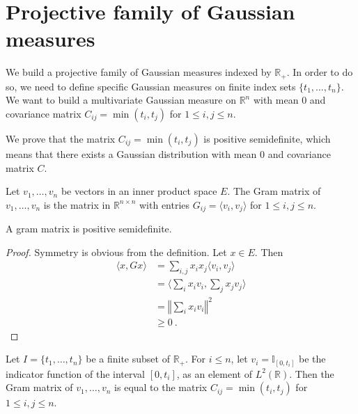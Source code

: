 \section{Projective family of Gaussian measures}

We build a projective family of Gaussian measures indexed by $\mathbb{R}_+$.
In order to do so, we need to define specific Gaussian measures on finite index sets $\{t_1, \ldots, t_n\}$.
We want to build a multivariate Gaussian measure on $\mathbb{R}^n$ with mean $0$ and covariance matrix $C_{ij} = \min(t_i, t_j)$ for $1 \leq i,j \leq n$.

We prove that the matrix $C_{ij} = \min(t_i, t_j)$ is positive semidefinite, which means that there exists a Gaussian distribution with mean 0 and covariance matrix $C$.

\begin{definition}\label{def:gramMatrix}
  \mathlibok
Let $v_1, \ldots, v_n$ be vectors in an inner product space $E$.
The Gram matrix of $v_1, \ldots, v_n$ is the matrix in $\mathbb{R}^{n \times n}$ with entries $G_{ij} = \langle v_i, v_j \rangle$ for $1 \leq i,j \leq n$.
\end{definition}


\begin{lemma}\label{lem:posSemidef_gramMatrix}
  \mathlibok
A gram matrix is positive semidefinite.
\end{lemma}

\begin{proof}Symmetry is obvious from the definition.
Let $x \in E$. Then
\begin{align*}
  \langle x, G x \rangle
  &= \sum_{i,j} x_i x_j \langle v_i, v_j \rangle
  \\
  &= \langle \sum_i x_i v_i, \sum_j x_j v_j \rangle
  \\
  &= \left\Vert \sum_i x_i v_i \right\Vert^2
  \\
  &\ge 0
  \: .
\end{align*}
\end{proof}


\begin{lemma}\label{lem:C_eq_gramMatrix}
  \leanok
Let $I = \{t_1, \ldots, t_n\}$ be a finite subset of $\mathbb{R}_+$.
For $i \le n$, let $v_i = \mathbb{I}_{[0, t_i]}$ be the indicator function of the interval $[0, t_i]$, as an element of $L^2(\mathbb{R})$.
Then the Gram matrix of $v_1, \ldots, v_n$ is equal to the matrix $C_{ij} = \min(t_i, t_j)$ for $1 \leq i,j \leq n$.
\end{lemma}


